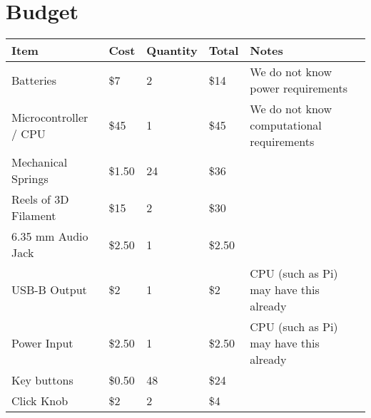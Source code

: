 \newpage
\section{Budget}
\begin{table}[h!]
  \centering
  \begin{tabular}{|l|l|l|l|l|}
    \hline
    \textbf{Item}                                 & \textbf{Cost}   & \textbf{Quantity}   & \textbf{Total}   & \textbf{Notes}                                                        \\ \hline
    Batteries                                     & \$7             & 2                   & \$14             & We do not know power requirements                                     \\ \hline
    Microcontroller / CPU                         & \$45            & 1                   & \$45             & We do not know computational requirements                             \\ \hline
    Mechanical Springs                            & \$1.50          & 24                  & \$36             &                                                                       \\ \hline
    Reels of 3D Filament                          & \$15            & 2                   & \$30             &                                                                       \\ \hline
    6.35 mm Audio Jack                            & \$2.50          & 1                   & \$2.50           &                                                                       \\ \hline
    USB-B Output                                  & \$2             & 1                   & \$2              & CPU (such as Pi) may have this already                                \\ \hline
    Power Input                                   & \$2.50          & 1                   & \$2.50           & CPU (such as Pi) may have this already                                \\ \hline
    Key buttons                                   & \$0.50          & 48                  & \$24             &                                                                       \\ \hline
    Click Knob                                    & \$2             & 2                   & \$4              &                                                                       \\ \hline

\end{tabular}
\end{table}
